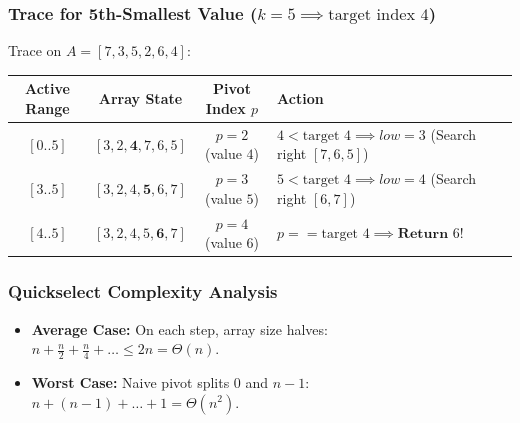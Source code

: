 \documentclass[11pt,a4paper]{article}
\begin{document}
\subsubsection{Trace for 5th-Smallest Value \texorpdfstring{($k = 5 \implies \text{target index } 4$)}{(k = 5)}}
Trace on $A = [7, 3, 5, 2, 6, 4]$:
\begin{center}
\begin{tabularx}{\textwidth}{c c c X}
\toprule
\textbf{Active Range} & \textbf{Array State} & \textbf{Pivot Index $p$} & \textbf{Action} \\
\midrule
$[0..5]$ & $[3, 2, \mathbf{4}, 7, 6, 5]$ & $p = 2$ (value $4$) & $4 < \text{target } 4 \implies low = 3$ (Search right $[7, 6, 5]$) \\
$[3..5]$ & $[3, 2, 4, \mathbf{5}, 6, 7]$ & $p = 3$ (value $5$) & $5 < \text{target } 4 \implies low = 4$ (Search right $[6, 7]$) \\
$[4..5]$ & $[3, 2, 4, 5, \mathbf{6}, 7]$ & $p = 4$ (value $6$) & $p == \text{target } 4 \implies \textbf{Return } 6$! \\
\bottomrule
\end{tabularx}
\end{center}

\subsubsection{Quickselect Complexity Analysis}
\begin{itemize}[itemsep=2pt]
    \item \textbf{Average Case:} On each step, array size halves: $n + \frac{n}{2} + \frac{n}{4} + \dots \le 2n = \Theta(n)$.
    \item \textbf{Worst Case:} Naive pivot splits $0$ and $n-1$: $n + (n-1) + \dots + 1 = \Theta(n^2)$.
\end{itemize}
\end{document}
